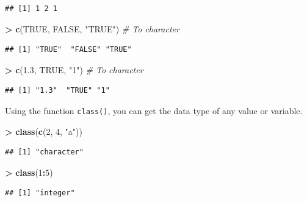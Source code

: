 \documentclass[]{book}
\newenvironment{Shaded}{\begin{snugshade}}{\end{snugshade}}
\newcommand{\CommentTok}[1]{\textcolor[rgb]{0.56,0.35,0.01}{\textit{#1}}}
\newcommand{\DecValTok}[1]{\textcolor[rgb]{0.00,0.00,0.81}{#1}}
\newcommand{\FloatTok}[1]{\textcolor[rgb]{0.00,0.00,0.81}{#1}}
\newcommand{\KeywordTok}[1]{\textcolor[rgb]{0.13,0.29,0.53}{\textbf{#1}}}
\newcommand{\NormalTok}[1]{#1}
\newcommand{\OperatorTok}[1]{\textcolor[rgb]{0.81,0.36,0.00}{\textbf{#1}}}
\newcommand{\OtherTok}[1]{\textcolor[rgb]{0.56,0.35,0.01}{#1}}
\newcommand{\StringTok}[1]{\textcolor[rgb]{0.31,0.60,0.02}{#1}}
\begin{document}
\begin{verbatim}
## [1] 1 2 1
\end{verbatim}

\begin{Shaded}
\begin{Highlighting}[]
\OperatorTok{>}\StringTok{ }\KeywordTok{c}\NormalTok{(}\OtherTok{TRUE}\NormalTok{, }\OtherTok{FALSE}\NormalTok{, }\StringTok{"TRUE"}\NormalTok{) }\CommentTok{# To character}
\end{Highlighting}
\end{Shaded}

\begin{verbatim}
## [1] "TRUE"  "FALSE" "TRUE"
\end{verbatim}

\begin{Shaded}
\begin{Highlighting}[]
\OperatorTok{>}\StringTok{ }\KeywordTok{c}\NormalTok{(}\FloatTok{1.3}\NormalTok{, }\OtherTok{TRUE}\NormalTok{, }\StringTok{"1"}\NormalTok{) }\CommentTok{# To character}
\end{Highlighting}
\end{Shaded}

\begin{verbatim}
## [1] "1.3"  "TRUE" "1"
\end{verbatim}

Using the function \texttt{class()}, you can get the data type of any value or variable.

\begin{Shaded}
\begin{Highlighting}[]
\OperatorTok{>}\StringTok{ }\KeywordTok{class}\NormalTok{(}\KeywordTok{c}\NormalTok{(}\DecValTok{2}\NormalTok{, }\DecValTok{4}\NormalTok{, }\StringTok{"a"}\NormalTok{))}
\end{Highlighting}
\end{Shaded}

\begin{verbatim}
## [1] "character"
\end{verbatim}

\begin{Shaded}
\begin{Highlighting}[]
\OperatorTok{>}\StringTok{ }\KeywordTok{class}\NormalTok{(}\DecValTok{1}\OperatorTok{:}\DecValTok{5}\NormalTok{)}
\end{Highlighting}
\end{Shaded}

\begin{verbatim}
## [1] "integer"
\end{verbatim}
\end{document}
